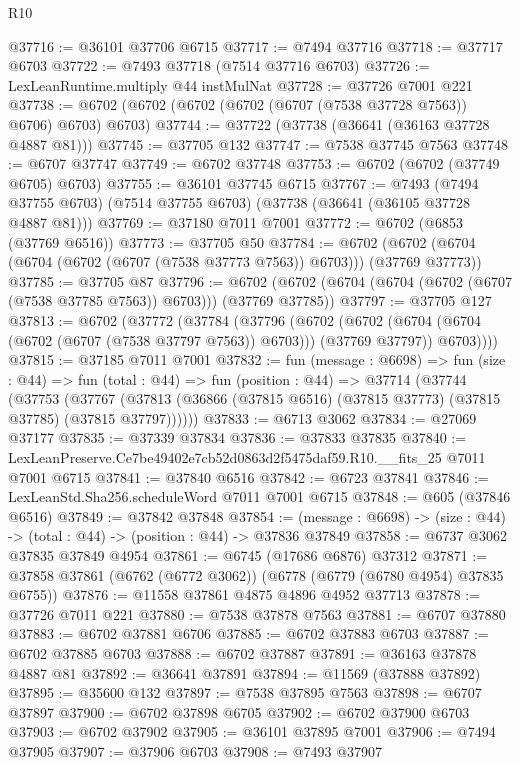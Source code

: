 \begin{lexlean}{R10}
\begin{coremodule}
@37716 := @36101 @37706 @6715
@37717 := @7494 @37716
@37718 := @37717 @6703
@37722 := @7493 @37718 (@7514 @37716 @6703)
@37726 := LexLeanRuntime.multiply @44 instMulNat
@37728 := @37726 @7001 @221
@37738 := @6702 (@6702 (@6702 (@6702 (@6707 (@7538 @37728 @7563)) @6706) @6703) @6703)
@37744 := @37722 (@37738 (@36641 (@36163 @37728 @4887 @81)))
@37745 := @37705 @132
@37747 := @7538 @37745 @7563
@37748 := @6707 @37747
@37749 := @6702 @37748
@37753 := @6702 (@6702 (@37749 @6705) @6703)
@37755 := @36101 @37745 @6715
@37767 := @7493
    (@7494 @37755 @6703)
    (@7514 @37755 @6703)
    (@37738 (@36641 (@36105 @37728 @4887 @81)))
@37769 := @37180 @7011 @7001
@37772 := @6702 (@6853 (@37769 @6516))
@37773 := @37705 @50
@37784 := @6702 (@6702 (@6704 (@6704 (@6702 (@6707 (@7538 @37773 @7563)) @6703))) (@37769 @37773))
@37785 := @37705 @87
@37796 := @6702 (@6702 (@6704 (@6704 (@6702 (@6707 (@7538 @37785 @7563)) @6703))) (@37769 @37785))
@37797 := @37705 @127
@37813 := @6702
    (@37772
      (@37784
        (@37796
          (@6702
            (@6702 (@6704 (@6704 (@6702 (@6707 (@7538 @37797 @7563)) @6703))) (@37769 @37797))
            @6703))))
@37815 := @37185 @7011 @7001
@37832 := fun (message : @6698) =>
  fun (size : @44) =>
  fun (total : @44) =>
  fun (position : @44) =>
  @37714
    (@37744
      (@37753
        (@37767 (@37813 (@36866 (@37815 @6516) (@37815 @37773) (@37815 @37785) (@37815 @37797))))))
@37833 := @6713 @3062
@37834 := @27069 @37177
@37835 := @37339 @37834
@37836 := @37833 @37835
@37840 := LexLeanPreserve.Ce7be49402e7cb52d0863d2f5475daf59.R10.__fits_25 @7011 @7001 @6715
@37841 := @37840 @6516
@37842 := @6723 @37841
@37846 := LexLeanStd.Sha256.scheduleWord @7011 @7001 @6715
@37848 := @605 (@37846 @6516)
@37849 := @37842 @37848
@37854 := (message : @6698) -> (size : @44) -> (total : @44) -> (position : @44) -> @37836 @37849
@37858 := @6737 @3062 @37835 @37849 @4954
@37861 := @6745 (@17686 @6876) @37312
@37871 := @37858 @37861 (@6762 (@6772 @3062)) (@6778 (@6779 (@6780 @4954) @37835 @6755))
@37876 := @11558 @37861 @4875 @4896 @4952 @37713
@37878 := @37726 @7011 @221
@37880 := @7538 @37878 @7563
@37881 := @6707 @37880
@37883 := @6702 @37881 @6706
@37885 := @6702 @37883 @6703
@37887 := @6702 @37885 @6703
@37888 := @6702 @37887
@37891 := @36163 @37878 @4887 @81
@37892 := @36641 @37891
@37894 := @11569 (@37888 @37892)
@37895 := @35600 @132
@37897 := @7538 @37895 @7563
@37898 := @6707 @37897
@37900 := @6702 @37898 @6705
@37902 := @6702 @37900 @6703
@37903 := @6702 @37902
@37905 := @36101 @37895 @7001
@37906 := @7494 @37905
@37907 := @37906 @6703
@37908 := @7493 @37907

\end{coremodule}
\end{lexlean}
